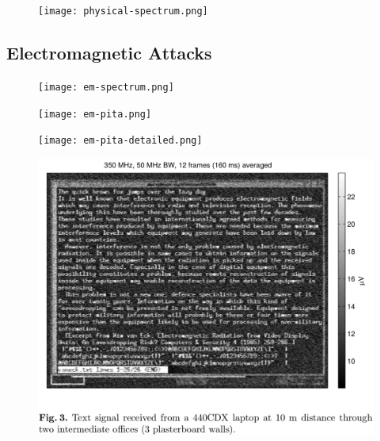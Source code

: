 \documentclass{beamer}
\begin{document}
\begin{frame}
  \begin{figure}
    \texttt{[image: physical-spectrum.png]}
  \end{figure}
\end{frame}

\subsection{Electromagnetic Attacks}

\begin{frame}
  \begin{figure}
    \texttt{[image: em-spectrum.png]}
  \end{figure}
\end{frame}

\begin{frame}
  \begin{figure}
    \texttt{[image: em-pita.png]}
  \end{figure}
\end{frame}

\begin{frame}
  \begin{figure}
    \texttt{[image: em-pita-detailed.png]}
  \end{figure}
\end{frame}

\begin{frame}
  \begin{figure}
    \includegraphics[height=0.9\textheight]{em-laptop.png}
  \end{figure}
  \cite{FlatPanelEmissions}
\end{frame}
\end{document}
